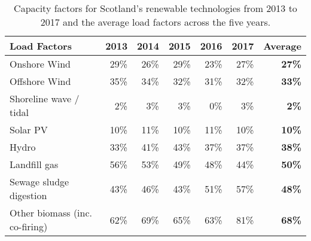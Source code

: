 \begin{table}[htbp]
	\caption{Capacity factors for Scotland's renewable technologies from 2013 to 2017 \citep{BEIS2018REs} and the average load factors across the five years.}
	\label{tbl:CFs}
	\centering
	\begin{tabular}{@{}lrrrrrr@{}}
		\toprule
		Load Factors & 2013 & 2014 & 2015 & 2016 & 2017 & \textbf{Average} \\ \midrule
		Onshore Wind & 29\% & 26\% & 29\% & 23\% & 27\% & \textbf{27\%} \\
		Offshore Wind & 35\% & 34\% & 32\% & 31\% & 32\% & \textbf{33\%} \\
		Shoreline wave / tidal & 2\% & 3\% & 3\% & 0\% & 3\% & \textbf{2\%} \\
		Solar PV & 10\% & 11\% & 10\% & 11\% & 10\% & \textbf{10\%} \\
		Hydro & 33\% & 41\% & 43\% & 37\% & 37\% & \textbf{38\%} \\
		Landfill gas & 56\% & 53\% & 49\% & 48\% & 44\% & \textbf{50\%} \\
		Sewage sludge digestion & 43\% & 46\% & 43\% & 51\% & 57\% & \textbf{48\%} \\
		Other biomass (inc. co-firing) & 62\% & 69\% & 65\% & 63\% & 81\% & \textbf{68\%} \\ \bottomrule
	\end{tabular}
\end{table}
